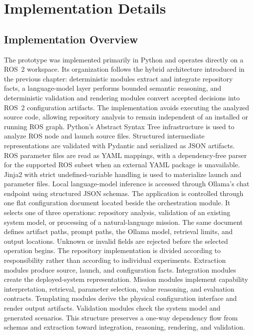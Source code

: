 \chapter{Implementation Details}
\section{Implementation Overview}
The prototype was implemented primarily in Python and operates directly on a ROS~2 workspace. Its organization follows the hybrid architecture introduced in the previous chapter: deterministic modules extract and integrate repository facts, a language-model layer performs bounded semantic reasoning, and deterministic validation and rendering modules convert accepted decisions into ROS~2 configuration artifacts. The implementation avoids executing the analyzed source code, allowing repository analysis to remain independent of an installed or running ROS graph.
Python's Abstract Syntax Tree infrastructure is used to analyze ROS node and launch source files. Structured intermediate representations are validated with Pydantic and serialized as JSON artifacts. ROS parameter files are read as YAML mappings, with a dependency-free parser for the supported ROS subset when an external YAML package is unavailable. Jinja2 \cite{jinja2025} with strict undefined-variable handling is used to materialize launch and parameter files. Local language-model inference is accessed through Ollama's chat endpoint using structured JSON schemas.
The application is controlled through one flat configuration document located beside the orchestration module. It selects one of three operations: repository analysis, validation of an existing system model, or processing of a natural-language mission. The same document defines artifact paths, prompt paths, the Ollama model, retrieval limits, and output locations. Unknown or invalid fields are rejected before the selected operation begins.
The repository implementation is divided according to responsibility rather than according to individual experiments. Extraction modules produce source, launch, and configuration facts. Integration modules create the deployed-system representation. Mission modules implement capability interpretation, retrieval, parameter selection, value reasoning, and evaluation contracts. Templating modules derive the physical configuration interface and render output artifacts. Validation modules check the system model and generated scenarios. This structure preserves a one-way dependency flow from schemas and extraction toward integration, reasoning, rendering, and validation.

